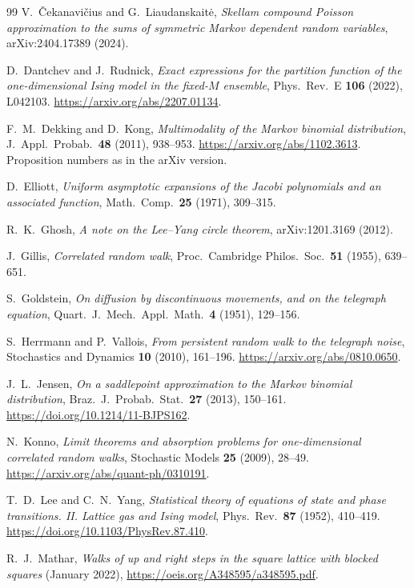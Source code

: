 \documentclass[11pt]{article}
\theoremstyle{definition}
\theoremstyle{remark}
\begin{document}
\begin{thebibliography}{99}
V.~\v{C}ekanavi\v{c}ius and G.~Liaudanskait\.{e}, \emph{Skellam compound
Poisson approximation to the sums of symmetric Markov dependent random
variables}, arXiv:2404.17389 (2024).

D.~Dantchev and J.~Rudnick, \emph{Exact expressions for the partition function of the
one-dimensional Ising model in the fixed-$M$ ensemble},
Phys.~Rev.~E \textbf{106} (2022), L042103.
\url{https://arxiv.org/abs/2207.01134}.

F.~M.~Dekking and D.~Kong, \emph{Multimodality of the Markov binomial distribution},
J.~Appl.~Probab.\ \textbf{48} (2011), 938--953.
\url{https://arxiv.org/abs/1102.3613}. Proposition numbers as in the arXiv version.

D.~Elliott, \emph{Uniform asymptotic expansions of the Jacobi polynomials and an associated
function}, Math.\ Comp.\ \textbf{25} (1971), 309--315.

R.~K.~Ghosh, \emph{A note on the Lee--Yang circle theorem}, arXiv:1201.3169
(2012).

J.~Gillis, \emph{Correlated random walk}, Proc.\ Cambridge Philos.\ Soc.\ \textbf{51} (1955),
639--651.

S.~Goldstein, \emph{On diffusion by discontinuous movements, and on the telegraph equation},
Quart.\ J.\ Mech.\ Appl.\ Math.\ \textbf{4} (1951), 129--156.

S.~Herrmann and P.~Vallois, \emph{From persistent random walk to the telegraph noise},
Stochastics and Dynamics \textbf{10} (2010), 161--196.
\url{https://arxiv.org/abs/0810.0650}.

J.~L.~Jensen, \emph{On a saddlepoint approximation to the Markov binomial
distribution}, Braz.\ J.\ Probab.\ Stat.\ \textbf{27} (2013), 150--161.
\url{https://doi.org/10.1214/11-BJPS162}.

N.~Konno, \emph{Limit theorems and absorption problems for one-dimensional correlated random
walks}, Stochastic Models \textbf{25} (2009), 28--49.
\url{https://arxiv.org/abs/quant-ph/0310191}.

T.~D.~Lee and C.~N.~Yang, \emph{Statistical theory of equations of state and
phase transitions. II. Lattice gas and Ising model}, Phys.\ Rev.\ \textbf{87}
(1952), 410--419. \url{https://doi.org/10.1103/PhysRev.87.410}.

R.~J.~Mathar, \emph{Walks of up and right steps in the square lattice with blocked squares}
(January 2022), \url{https://oeis.org/A348595/a348595.pdf}.


\end{thebibliography}
\end{document}
